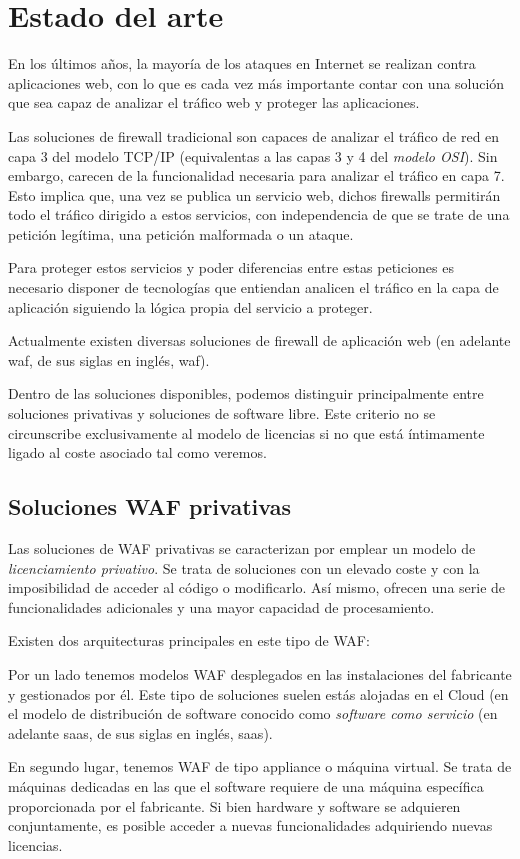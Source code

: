 \chapter{Estado del arte}
\par En los últimos años, la mayoría de los ataques en Internet se realizan contra aplicaciones web, con lo que es cada vez más importante
contar con una solución que sea capaz de analizar el tráfico web y proteger las aplicaciones.
\par Las soluciones de firewall tradicional son capaces de analizar el tráfico de red en capa 3 del modelo TCP/IP (equivalentas a las capas 3 y
4 del {\em modelo OSI\cite{osi}}). Sin embargo, carecen de la funcionalidad necesaria para analizar el tráfico en capa 7. Esto implica que,
una vez se publica un servicio web, dichos firewalls permitirán todo el tráfico dirigido a estos servicios, con independencia de que se trate
de una petición legítima, una petición malformada o un ataque.
\par Para proteger estos servicios y poder diferencias entre estas peticiones es necesario disponer de tecnologías que entiendan analicen el tráfico en la capa de aplicación siguiendo la lógica propia del servicio a proteger.
\par Actualmente existen diversas soluciones de firewall de aplicación web (en adelante \acrshort{waf}, de sus siglas en inglés, \acrlong{waf}).

\par Dentro de las soluciones disponibles, podemos distinguir principalmente entre soluciones privativas y soluciones de software libre. Este
criterio no se circunscribe exclusivamente al modelo de licencias si no que está íntimamente ligado al coste asociado tal como veremos.

\section{Soluciones WAF privativas}
\par Las soluciones de WAF privativas se caracterizan por emplear un modelo de {\em licenciamiento privativo\cite{privativo}}. Se trata de
soluciones con un elevado coste y con la imposibilidad de acceder al código o modificarlo. Así mismo, ofrecen una serie de funcionalidades
adicionales y una mayor capacidad de procesamiento.
\par Existen dos arquitecturas principales en este tipo de WAF:
\par Por un lado tenemos modelos WAF desplegados en las instalaciones del fabricante y gestionados por él. Este tipo de soluciones suelen estás
alojadas en el Cloud (en el modelo de distribución de software conocido como {\em software como servicio} (en adelante \acrshort{saas}, de sus
siglas en inglés, \acrlong{saas}).
\par En segundo lugar, tenemos WAF de tipo appliance o máquina virtual. Se trata de máquinas dedicadas en las que el software requiere de una
máquina específica proporcionada por el fabricante. Si bien hardware y software se adquieren conjuntamente, es posible acceder a nuevas
funcionalidades adquiriendo nuevas licencias.

